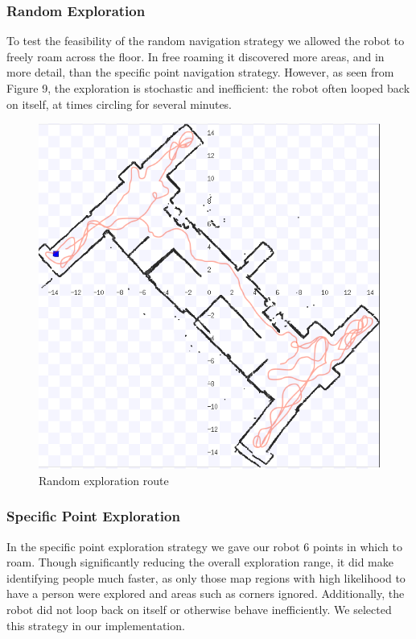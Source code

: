 \documentclass{article}
\begin{document}
\begin{multicols}{2}
      \subsubsection{Random Exploration}
   To test the feasibility of the random navigation strategy we allowed the robot to freely roam across the floor. In free roaming it discovered more areas, and in more detail, than the specific point navigation strategy. However, as seen from Figure 9, the exploration is stochastic and inefficient: the robot often looped back on itself, at times circling for several minutes.
  \begin{figure}[H]
              \includegraphics[width=\linewidth]{ExperimentalResults9}
              \caption{Random exploration route}
          \end{figure}
          
      \subsubsection{Specific Point Exploration}
   In the specific point exploration strategy we gave our robot 6 points in which to roam. Though significantly reducing the overall exploration range, it did make identifying people much faster, as only those map regions with high likelihood to have a person were explored and areas such as corners ignored. Additionally, the robot did not loop back on itself or otherwise behave inefficiently. We selected this strategy in our implementation.


\end{multicols}
\end{document}
